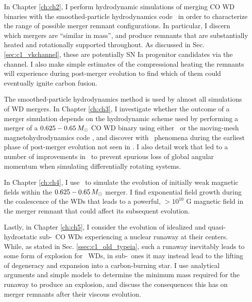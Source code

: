 
In Chapter \ref{ch:ch2}, I perform hydrodynamic simulations of merging CO WD binaries with the smoothed-particle hydrodynamics code \gasoline\ in order to characterize the range of possible merger remnant configurations.  In particular, I discern which mergers are ``similar in mass'', and produce remnants that are substantially heated and rotationally supported throughout.  As discussed in Sec. \ref{sec:c1_vkchannel}, these are potentially SN Ia progenitor candidates via the \citeal{vkercj10} channel.  I also make simple estimates of the compressional heating the remnants will experience during post-merger evolution to find which of them could eventually ignite carbon fusion.

The smoothed-particle hydrodynamics method is used by almost all simulations of WD mergers.  In Chapter \ref{ch:ch3}, I investigate whether the outcome of a merger simulation depends on the hydrodynamic scheme used by performing a merger of a $0.625 - 0.65\,\Msun$ CO WD binary using either \gasoline\ or the moving-mesh magnetohydrodynamics code \arepo, and discover with \arepo\ phenomena during the earliest phase of post-merger evolution not seen in \gasoline.  I also detail work that led to a number of improvements in \arepo\ to prevent spurious loss of global angular momentum when simulating differentially rotating systems.

In Chapter \ref{ch:ch4}, I use \arepo\ to simulate the evolution of initially weak magnetic fields within the $0.625 - 0.65\,\Msun$ merger.  I find exponential field growth during the coalescence of the WDs that leads to a powerful, $>10^{10}$ G magnetic field in the merger remnant that could affect its subsequent evolution.

Lastly, in Chapter \ref{ch:ch5}, I consider the evolution of idealized and quasi-hydrostatic sub-\Mch\ CO WDs experiencing a nuclear runaway at their centers.  While, as stated in Sec. \ref{ssec:c1_old_typeia}, such a runaway inevitably leads to some form of explosion for \Mch\ WDs, in sub-\Mch\ ones it may instead lead to the lifting of degeneracy and expansion into a carbon-burning star.  I use analytical arguments and simple models to determine the minimum mass required for the runaway to produce an explosion, and discuss the consequences this has on merger remnants after their viscous evolution.

